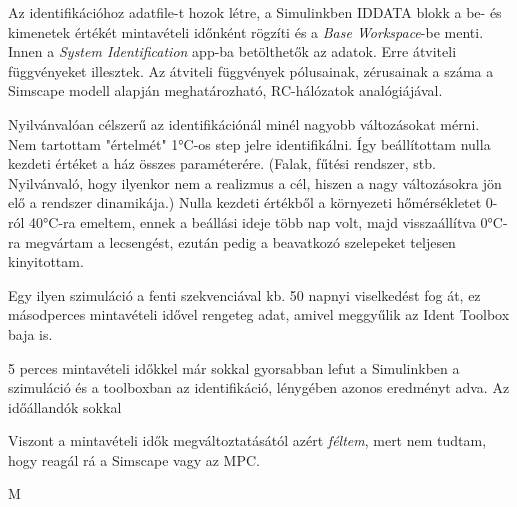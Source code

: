Az identifikációhoz adatfile-t hozok létre, a Simulinkben IDDATA blokk a be- és kimenetek értékét mintavételi időnként rögzíti és a \textit{Base Workspace}-be menti. Innen a \textit{System Identification} app-ba betölthetők az adatok. %
Erre átviteli függvényeket illesztek. Az átviteli függvények pólusainak, zérusainak a száma a Simscape modell alapján meghatározható, RC-hálózatok analógiájával.

Nyilvánvalóan célszerű az identifikációnál minél nagyobb változásokat mérni. Nem tartottam "értelmét" 1\si{\celsius}-os step jelre identifikálni. Így beállítottam nulla kezdeti értéket a ház összes paraméterére. (Falak, fűtési rendszer, stb. Nyilvánvaló, hogy ilyenkor nem a realizmus a cél, hiszen a nagy változásokra jön elő a rendszer dinamikája.) Nulla kezdeti értékből a környezeti hőmérsékletet 0-ról 40\si{\celsius}-ra emeltem, ennek a beállási ideje több nap volt, majd visszaállítva 0\si{\celsius}-ra megvártam a lecsengést, ezután pedig a beavatkozó szelepeket teljesen kinyitottam. 

Egy ilyen szimuláció a fenti szekvenciával kb. 50 napnyi viselkedést fog át, ez másodperces mintavételi idővel rengeteg adat, amivel meggyűlik az Ident Toolbox baja is.

5 perces mintavételi időkkel már sokkal gyorsabban lefut a Simulinkben a szimuláció és a toolboxban az identifikáció, lénygében azonos eredményt adva. Az időállandók sokkal 

Viszont a mintavételi idők megváltoztatásától azért \textit{féltem}, mert nem tudtam, hogy reagál rá a Simscape vagy az MPC.

M%
%
%
%
%


\pagebreak
